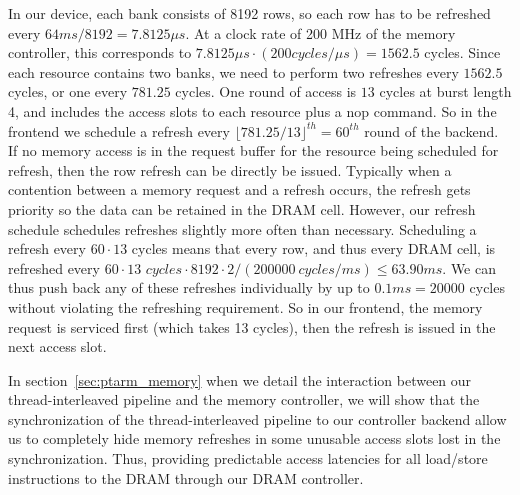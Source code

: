 In our device, each bank consists of 8192 rows, so each row has to be refreshed every $64\textit{ms}/8192=7.8125 {\mu}s$.
At a clock rate of 200 MHz of the memory controller, this corresponds to $7.8125 {\mu}s \cdot (200 \textit{cycles}/{\mu}s) = 1562.5$ cycles.
Since each resource contains two banks, we need to perform two refreshes every $1562.5$ cycles, or one every $781.25$ cycles.
One round of access is $13$ cycles at burst length 4, and includes the access slots to each resource plus a nop command. 
So in the frontend we schedule a refresh every $\lfloor 781.25/13 \rfloor^{th} = 60^{th}$ round of the backend.
If no memory access is in the request buffer for the resource being scheduled for refresh, then the row refresh can be directly be issued. 
Typically when a contention between a memory request and a refresh occurs, the refresh gets priority so the data can be retained in the DRAM cell. 
However, our refresh schedule schedules refreshes slightly more often than necessary.   
Scheduling a refresh every $60 \cdot 13$ cycles means that every row, and thus every DRAM cell, is refreshed every $60\cdot 13 \textit{ cycles}\cdot 8192\cdot 2/(200000~\textit{cycles}/\textit{ms}) \leq 63.90\textit{ms}$.
We can thus push back any of these refreshes individually by up to $0.1\textit{ms} = 20000$ cycles without violating the refreshing requirement.
So in our frontend, the memory request is serviced first (which takes 13 cycles), then the refresh is issued in the next access slot. 

In section~\ref{sec:ptarm_memory} when we detail the interaction between our thread-interleaved pipeline and the memory controller, we will show that the synchronization of the thread-interleaved pipeline to our controller backend allow us to completely hide memory refreshes in some unusable access slots lost in the synchronization.
Thus, providing predictable access latencies for all load/store instructions to the DRAM through our DRAM controller.



